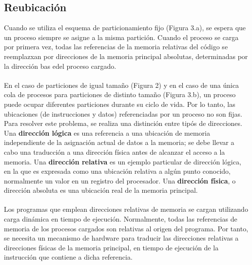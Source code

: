 \documentclass[12pt, a4paper]{article}
\begin{document}
\subsection{Reubicación}
Cuando se utiliza el esquema de particionamiento fijo (Figura 3.a), se espera que un proceso siempre se asigne a la misma partición. Cuando el proceso se carga por primera vez, todas las referencias de la memoria relativas del código se reemplazxan por direcciones de la memoria principal absolutas, determinadas por la dirección bas edel proceso cargado.\\\\ 
En el caso de particiones de igual tamaño (Figura 2) y en el caso de una única cola de procesos para particiones de distinto tamaño (Figura 3.b), un proceso puede ocupar diferentes particiones durante su ciclo de vida. Por lo tanto, las ubicaciones (de instrucciones y datos) referenciadas por un proceso no son fijas. Para resolver este problema, se realiza una distinción entre tipós de direcciones. Una \textbf{dirección lógica} es una referencia a una ubicación de memoria independiente de la asignación actual de datos a la memoria; se debe llevar a cabo una traducción a una dirección física antes de alcanzar el acceso a la memoria. Una \textbf{dirección relativa} es un ejemplo particular de dirección lógica, en la que es expresada como una ubicación relativa a algún punto conocido, normalmente un valor en un registro del procesador. Una \textbf{dirección física}, o dirección absoluta es una ubicación real de la memoria principal. \\\\ 
Los programas que emplean direcciones relativas de memoria se cargan utilizando carga dinámica en tiempo de ejecución. Normalmente, todas las referencias de memoria de los procesos cargados son relativas al origen del programa. Por tanto, se necesita un mecanismo de hardware para traducir las direcciones relativas a direcciones físicas de la memoria principal, en tiempo de ejecución de la instrucción que contiene a dicha referencia. \\\\ 
\end{document}

